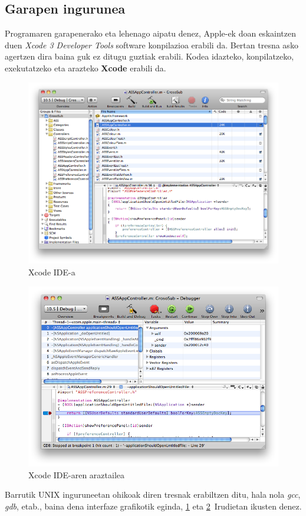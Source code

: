 \subsection{Garapen ingurunea}
Programaren garapenerako eta lehenago aipatu denez, Apple-ek doan eskaintzen duen \textit{Xcode 3 Developer Tools} software konpilazioa erabili da. Bertan tresna asko agertzen dira baina guk ez ditugu guztiak erabili. Kodea idazteko, konpilatzeko, exekutatzeko eta arazteko \textbf{Xcode} erabili da.
\begin{figure}[htp]
\begin{center}
\includegraphics[scale=0.4]{Pictures/Chapter4/Inplementazioa/xcode.png}
\caption{Xcode IDE-a}
\label{xcode}
\end{center}
\end{figure}
\begin{figure}[htp]
\begin{center}
\includegraphics[scale=0.4]{Pictures/Chapter4/Inplementazioa/araztailea.png}
\caption{Xcode IDE-aren araztailea}
\label{debug}
\end{center}
\end{figure}
Barrutik UNIX inguruneetan ohikoak diren tresnak erabiltzen ditu, hala nola \textit{gcc}, \textit{gdb}, etab., baina dena interfaze grafikotik eginda, \ref{xcode} eta \ref{debug}~Irudietan ikusten denez.


